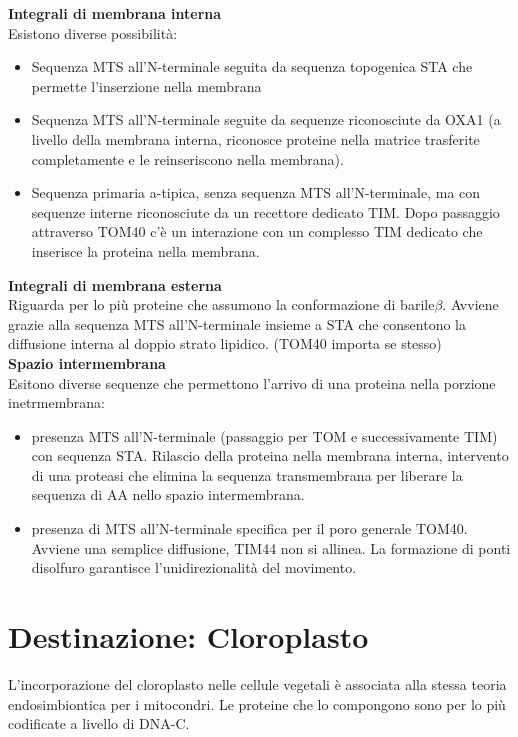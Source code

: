             \textbf{Integrali di membrana interna}\\
                Esistono diverse possibilità: 
                \begin{itemize}
                    \item Sequenza MTS all'N-terminale seguita da sequenza topogenica STA che permette l'inserzione nella membrana
                    \item Sequenza MTS all'N-terminale seguite da sequenze riconosciute da OXA1 (a livello della membrana interna, riconosce proteine nella matrice trasferite completamente e le reinseriscono nella membrana).
                    \item Sequenza primaria a-tipica, senza sequenza MTS all'N-terminale, ma con sequenze interne riconosciute da un recettore dedicato TIM. Dopo passaggio attraverso TOM40 c'è un interazione con un complesso TIM dedicato che inserisce la proteina nella membrana.
                \end{itemize}
            
            \textbf{Integrali di membrana esterna}\\
                Riguarda per lo più proteine che assumono la conformazione di barile$\beta$. Avviene grazie alla sequenza MTS all'N-terminale insieme a STA che consentono la diffusione interna al doppio strato lipidico. (TOM40 importa se stesso)\\
            
            \textbf{Spazio intermembrana}\\
                Esitono diverse sequenze che permettono l'arrivo di una proteina nella porzione inetrmembrana:
                \begin{itemize}
                    \item presenza MTS all'N-terminale (passaggio per TOM e successivamente TIM) con sequenza STA. Rilascio della proteina nella membrana interna, intervento di una proteasi che elimina la sequenza transmembrana per liberare la sequenza di AA nello spazio intermembrana.
                    \item presenza di MTS all'N-terminale specifica per il poro generale TOM40. Avviene una semplice diffusione, TIM44 non si allinea. La formazione di ponti disolfuro garantisce l'unidirezionalità del movimento. 
                \end{itemize}
            
\section{Destinazione: Cloroplasto}
    L'incorporazione del cloroplasto nelle cellule vegetali è associata alla stessa teoria endosimbiontica per i mitocondri. Le proteine che lo compongono sono per lo più codificate a livello di DNA-C.
